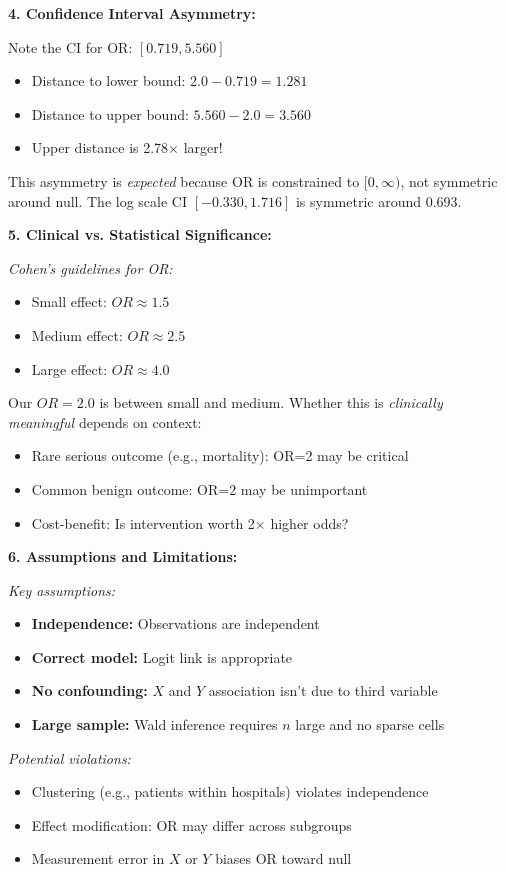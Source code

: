 \documentclass[12pt]{article}
\begin{document}
\begin{explanation}
\textbf{4. Confidence Interval Asymmetry:}

Note the CI for OR: $[0.719, 5.560]$
\begin{itemize}
\item Distance to lower bound: $2.0 - 0.719 = 1.281$
\item Distance to upper bound: $5.560 - 2.0 = 3.560$
\item Upper distance is 2.78$\times$ larger!
\end{itemize}

This asymmetry is \textit{expected} because OR is constrained to $[0, \infty)$, not symmetric around null. The log scale CI $[-0.330, 1.716]$ is symmetric around $0.693$.

\textbf{5. Clinical vs. Statistical Significance:}

\textit{Cohen's guidelines for OR:}
\begin{itemize}
\item Small effect: $OR \approx 1.5$
\item Medium effect: $OR \approx 2.5$
\item Large effect: $OR \approx 4.0$
\end{itemize}

Our $OR = 2.0$ is between small and medium. Whether this is \textit{clinically meaningful} depends on context:
\begin{itemize}
\item Rare serious outcome (e.g., mortality): OR=2 may be critical
\item Common benign outcome: OR=2 may be unimportant
\item Cost-benefit: Is intervention worth 2$\times$ higher odds?
\end{itemize}

\textbf{6. Assumptions and Limitations:}

\textit{Key assumptions:}
\begin{itemize}
\item \textbf{Independence:} Observations are independent
\item \textbf{Correct model:} Logit link is appropriate
\item \textbf{No confounding:} $X$ and $Y$ association isn't due to third variable
\item \textbf{Large sample:} Wald inference requires $n$ large and no sparse cells
\end{itemize}

\textit{Potential violations:}
\begin{itemize}
\item Clustering (e.g., patients within hospitals) violates independence
\item Effect modification: OR may differ across subgroups
\item Measurement error in $X$ or $Y$ biases OR toward null
\end{itemize}


\end{explanation}
\end{document}
